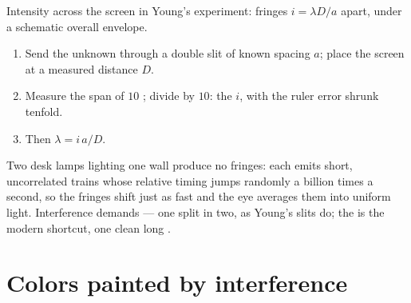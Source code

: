 \begin{omfigure}

{\small Intensity across the screen in Young's experiment: fringes
$i = \lambda D/a$ apart, under a schematic overall envelope.}
\end{omfigure}

\begin{method}\label{met:g12:light-as-wave:lambda}
\begin{enumerate}
  \item Send the unknown  through a double slit of known spacing
        $a$; place the screen at a measured distance $D$.
  \item Measure the span of $10$ ; divide by $10$: the
         $i$, with the ruler error shrunk tenfold.
  \item Then $\lambda = i\,a/D$.
\end{enumerate}
\end{method}

\begin{remark}\label{rem:g12:light-as-wave:lamps}
Two desk lamps lighting one wall produce no fringes: each emits
short, uncorrelated  trains whose relative timing jumps randomly
a billion times a second, so the fringes shift just as fast and the
eye averages them into uniform light. Interference demands 
--- one  split in two, as Young's slits do; the  is the
modern shortcut, one clean long .
\end{remark}

\section{Colors painted by interference}

